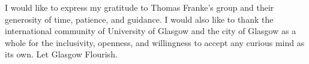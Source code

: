 \begin{acknowledgements}
I would like to express my gratitude to Thomas Franke's group and their generosity of time, patience, and guidance. I would also like to thank the international community of University of Glasgow and the city of Glasgow as a whole for the inclusivity, openness, and willingness to accept any curious mind as its own. Let Glasgow Flourish.
\end{acknowledgements}